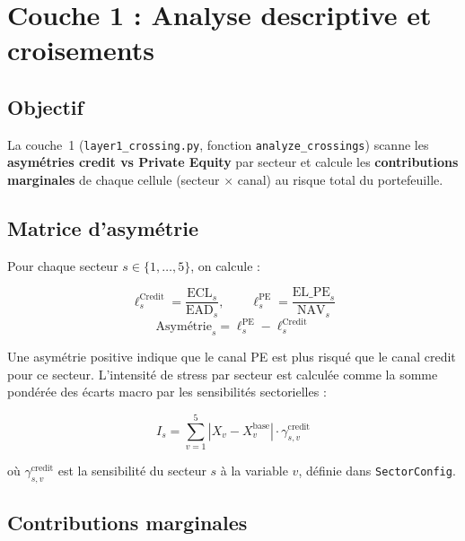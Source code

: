 \documentclass[12pt,a4paper]{article}
\begin{document}
\section{Couche 1 : Analyse descriptive et croisements}

\subsection{Objectif}

La couche~1 (\texttt{layer1\_crossing.py}, fonction \texttt{analyze\_crossings})
scanne les \textbf{asym\'etries credit vs Private Equity} par secteur et calcule
les \textbf{contributions marginales} de chaque cellule (secteur $\times$ canal)
au risque total du portefeuille.

\subsection{Matrice d'asym\'etrie}

Pour chaque secteur $s \in \{1, \ldots, 5\}$, on calcule :

\begin{formulebox}
\begin{equation}
    \ell_s^{\text{Credit}} = \frac{\text{ECL}_s}{\text{EAD}_s}, \qquad
    \ell_s^{\text{PE}} = \frac{\text{EL\_PE}_s}{\text{NAV}_s}
    \label{eq:loss_rates}
\end{equation}
\begin{equation}
    \text{Asym\'etrie}_s = \ell_s^{\text{PE}} - \ell_s^{\text{Credit}}
    \label{eq:asymmetry}
\end{equation}
\end{formulebox}

Une asym\'etrie positive indique que le canal PE est plus risqu\'e que le canal credit
pour ce secteur. L'intensit\'e de stress par secteur est calcul\'ee comme la somme pond\'er\'ee
des \'ecarts macro par les sensibilit\'es sectorielles :

\begin{equation}
    I_s = \sum_{v=1}^{5} \left| X_v - X_v^{\text{base}} \right| \cdot \gamma_{s,v}^{\text{credit}}
    \label{eq:stress_intensity}
\end{equation}

o\`u $\gamma_{s,v}^{\text{credit}}$ est la sensibilit\'e du secteur $s$ \`a la variable $v$,
d\'efinie dans \texttt{SectorConfig}.

\subsection{Contributions marginales}
\end{document}

